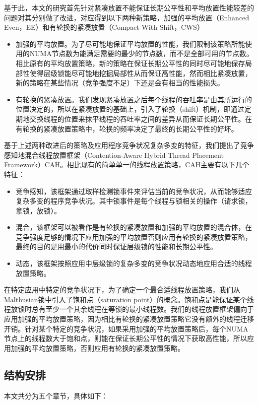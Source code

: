 基于此，本文的研究首先针对紧凑放置不能保证长期公平性和平均放置性能较差的问题对其分别做了改进，对应得到以下两种新策略，加强的平均放置（Enhanced Even，EE）和有轮换的紧凑放置（Compact With Shift，CWS）
\begin{itemize}
\item 加强的平均放置。为了尽可能地保证平均放置的性能，我们限制该策略所能使用的NUMA节点数为能满足需要的最少的节点数，而不是全部可用的节点数。相比原有的平均放置策略，新的策略在保证长期公平性的同时尽可能地保存局部性使得层级锁能尽可能地挖掘局部性从而保证高性能，然而相比紧凑放置，新的策略在某些情况（竞争强度不足）下还是会有相当的性能损失。
\item 有轮换的紧凑放置。我们发现紧凑放置之后每个线程的吞吐率是由其所运行的位置决定的，所以在紧凑放置的基础上，引入了轮换（shift）机制，即通过定期地交换线程的位置来抹平线程的吞吐率之间的差异从而保证长期公平性。在有轮换的紧凑放置策略中，轮换的频率决定了最终的长期公平性的好坏。
\end{itemize}
基于上述两种改进后的策略及应用程序竞争状况复杂多变的特征，我们提出了竞争感知地混合线程放置框架（Contention-Aware Hybrid Thread Placement Framework）CAH。相比现有的简单单一的线程放置策略，CAH主要有以下几个特征：
\begin{itemize}
\item 竞争感知，该框架通过取样检测锁事件来评估当前的竞争状况，从而能够适应复杂多变的程序竞争状况。其中锁事件是每个线程与锁相关的操作（请求锁，拿锁，放锁）。
\item 混合，该框架可以被看作是有轮换的紧凑放置和加强的平均放置的混合体，在竞争强度足够的情况下应用加强的平均放置否则应用有轮换的紧凑放置策略，最终的目的是用最小的代价同时保证层级锁的性能和长期公平性。
\item 动态，该框架按照应用中层级锁的复杂多变的竞争状况动态地应用合适的线程放置策略。
\end{itemize}

在特定应用中特定的竞争状况下，为了确定一个最合适线程放置策略，我们从Malthusian锁中引入了饱和点（saturation point）的概念。饱和点是能保证某个线程放锁时总有至少一个其余线程在等锁的最小线程数。我们的线程放置框架偏向于应用加强的平均放置策略，因为相比有轮换的紧凑放置策略它没有额外的线程迁移开销。针对某个特定的竞争状况，如果采用加强的平均放置策略后，每个NUMA节点上的线程数大于饱和点，则能在保证长期公平性的情况下获取高性能，所以应用加强的平均放置策略，否则应用有轮换的紧凑放置策略。
\subsection{结构安排}
本文共分为五个章节，具体如下：


